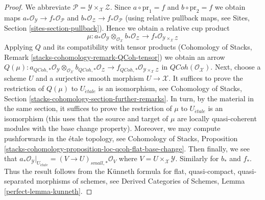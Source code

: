 \documentclass[10pt,a4paper]{amsart}
\theoremstyle{plain}
\theoremstyle{definition}
\theoremstyle{remark}
\numberwithin{equation}{subsection}
\def\etale{{\acute{e}tale}}
\def\QCoh{\mathit{QCoh}}
\begin{document}
\begin{proof}
We abbreviate $\mathcal{P} = \mathcal{Y} \times_\mathcal{X} \mathcal{Z}$.
Since $a \circ \text{pr}_1 = f$ and $b \circ \text{pr}_2 = f$
we obtain maps $a_*\mathcal{O}_\mathcal{Y} \to f_*\mathcal{O}_\mathcal{P}$
and $b_*\mathcal{O}_\mathcal{Z} \to f_*\mathcal{O}_\mathcal{P}$ (using
relative pullback maps, see Sites, Section \ref{sites-section-pullback}).
Hence we obtain a relative cup product
$$
\mu :
a_*\mathcal{O}_\mathcal{Y}
\otimes_{\mathcal{O}_\mathcal{X}}
b_*\mathcal{O}_\mathcal{Z} \longrightarrow
f_*\mathcal{O}_{\mathcal{Y} \times_\mathcal{X} \mathcal{Z}}
$$
Applying $Q$ and its compatibility with tensor products
(Cohomology of Stacks, Remark \ref{stacks-cohomology-remark-QCoh-tensor})
we obtain an arrow
$Q(\mu) : a_{\QCoh, *}\mathcal{O}_\mathcal{Y}
\otimes_{\mathcal{O}_\mathcal{X}}
b_{\QCoh, *}\mathcal{O}_\mathcal{Z} \to
f_{\QCoh, *}\mathcal{O}_{\mathcal{Y} \times_\mathcal{X} \mathcal{Z}}$
in $\QCoh(\mathcal{O}_\mathcal{X})$.
Next, choose a scheme $U$ and a surjective smooth morphism
$U \to \mathcal{X}$. It suffices to prove the restriction of
$Q(\mu)$ to $U_\etale$ is an isomorphism, see
Cohomology of Stacks, Section \ref{stacks-cohomology-section-further-remarks}.
In turn, by the material in the same section,
it suffices to prove the restriction of $\mu$ to $U_\etale$
is an isomorphism (this uses that the source and target of $\mu$
are locally quasi-coherent modules with the base change property).
Moreover, we may compute pushforwards in the \'etale topology, see
Cohomology of Stacks, Proposition
\ref{stacks-cohomology-proposition-loc-qcoh-flat-base-change}.
Then finally, we see that
$a_*\mathcal{O}_\mathcal{Y}|_{U_\etale} = (V \to U)_{small, *}\mathcal{O}_V$
where $V = U \times_\mathcal{X} \mathcal{Y}$.
Similarly for $b_*$ and $f_*$. Thus the result follows
from the K\"unneth formula for flat, quasi-compact, quasi-separated
morphisms of schemes, see Derived Categories of Schemes,
Lemma \ref{perfect-lemma-kunneth}.
\end{proof}
\end{document}
